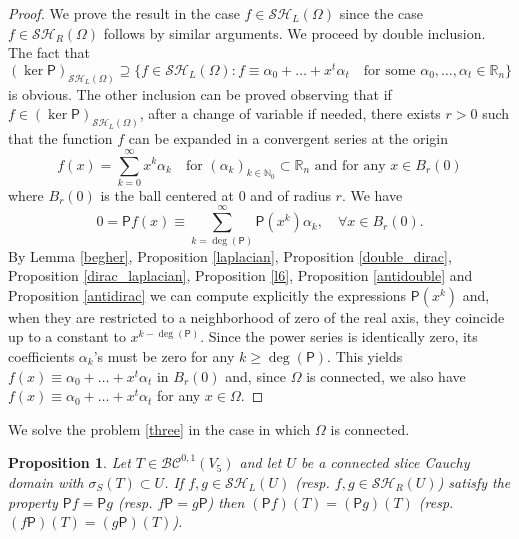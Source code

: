 \documentclass[reqno,11pt]{amsart}
\numberwithin{equation}{section}
\newtheorem{proposition}[theorem]{Proposition}
\theoremstyle{definition}
\begin{document}
\begin{proof}
	We prove the result in the case $f\in \mathcal{SH}_L(\Omega)$ since the case $f\in \mathcal{SH}_R(\Omega)$ follows by similar arguments. We proceed by double inclusion. The fact that
	$$
	(\ker{\mathsf P})_{\mathcal{SH}_L(\Omega)}\supseteq\{f\in \mathcal{SH}_L(\Omega): f\equiv \alpha_0+\dots+x^t \alpha_t\quad\textrm{for some $\alpha_0,\dots,\alpha_t\in\mathbb R_n$}\}
	$$ is obvious. The other inclusion can be proved observing that if $f\in (\ker{\mathsf P})_{\mathcal{SH}_L(\Omega)}$, after a change of variable if needed, there exists $r>0$ such that the function $f$ can be expanded in a convergent series at the origin
	$$f(x)=\sum_{k=0}^{\infty}x^k \alpha_k\quad\textrm{for $(\alpha_k)_{k\in\mathbb N_0}\subset\mathbb R_n$ and for any $x\in B_r(0)$}$$
	where $B_r(0)$ is the ball centered at $0$ and of radius $r$. We have
	$$
	0=\mathsf Pf(x)\equiv\sum_{k=\operatorname{deg}(\mathsf P)}^{\infty} \mathsf P(x^k)\alpha_k,\quad \forall x\in B_r(0).
	$$
	By Lemma \ref{begher}, Proposition \ref{laplacian}, Proposition \ref{double_dirac}, Proposition \ref{dirac_laplacian}, Proposition \ref{l6}, Proposition \ref{antidouble} and Proposition \ref{antidirac} we can compute explicitly the expressions $\mathsf P(x^k)$ and, when they are restricted to a neighborhood of zero of the real axis, they coincide up to a constant to $x^{k-\operatorname{deg}(\mathsf P)}$. Since the power series is identically zero, its coefficients $\alpha_k$'s must be zero for any $k\geq \operatorname{deg}(\mathsf P)$. This yields $f(x)\equiv \alpha_0+\dots +x^t\alpha_t$ in $B_r(0)$ and, since $\Omega$ is connected, we also have $f(x)\equiv \alpha_0+\dots +x^t\alpha_t$ for any $x\in\Omega$.
\end{proof}
We solve the problem \ref{three} in the case in which $ \Omega$ is connected.
\begin{proposition}\label{con}
	Let $T\in\mathcal{BC}^{0,1}(V_5)$ and let $U$ be a  connected slice   Cauchy domain with $\sigma_S(T)\subset U$. If $f,g\in \mathcal{SH}_L(U)$ (resp. $f,g\in \mathcal{SH}_R(U)$) satisfy the property $\mathsf Pf=\mathsf Pg$ (resp. $f\mathsf P=g\mathsf P$) then $ (\mathsf Pf)(T)=(\mathsf Pg)(T)$ (resp. $(f\mathsf P)(T)=(g\mathsf P)(T)$).
\end{proposition}
\end{document}

